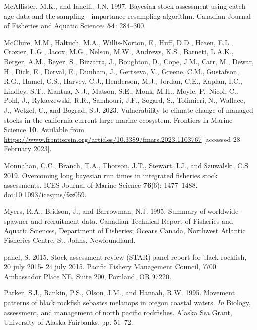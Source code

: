 \documentclass[11pt,
  letterpaper,
]{article}
\newlength{\cslhangindent}
\newenvironment{CSLReferences}[2] %
 {%
  \setlength{\parindent}{0pt}
  \ifodd #1 \everypar{\setlength{\hangindent}{\cslhangindent}}\ignorespaces\fi
  \ifnum #2 > 0
  \setlength{\parskip}{#2\baselineskip}
  \fi
 }%
 {}
\begin{document}
\begin{CSLReferences}{1}{0}
\leavevmode{}%
McAllister, M.K., and Ianelli, J.N. 1997. Bayesian stock assessment using catch-age data and the sampling - importance resampling algorithm. Canadian Journal of Fisheries and Aquatic Sciences \textbf{54}: 284--300.

\leavevmode{}%
McClure, M.M., Haltuch, M.A., Willis-Norton, E., Huff, D.D., Hazen, E.L., Crozier, L.G., Jacox, M.G., Nelson, M.W., Andrews, K.S., Barnett, L.A.K., Berger, A.M., Beyer, S., Bizzarro, J., Boughton, D., Cope, J.M., Carr, M., Dewar, H., Dick, E., Dorval, E., Dunham, J., Gertseva, V., Greene, C.M., Gustafson, R.G., Hamel, O.S., Harvey, C.J., Henderson, M.J., Jordan, C.E., Kaplan, I.C., Lindley, S.T., Mantua, N.J., Matson, S.E., Monk, M.H., Moyle, P., Nicol, C., Pohl, J., Rykaczewski, R.R., Samhouri, J.F., Sogard, S., Tolimieri, N., Wallace, J., Wetzel, C., and Bograd, S.J. 2023. Vulnerability to climate change of managed stocks in the california current large marine ecosystem. Frontiers in Marine Science \textbf{10}. Available from \url{https://www.frontiersin.org/articles/10.3389/fmars.2023.1103767} {[}accessed 28 February 2023{]}.

\leavevmode{}%
Monnahan, C.C., Branch, T.A., Thorson, J.T., Stewart, I.J., and Szuwalski, C.S. 2019. Overcoming long bayesian run times in integrated fisheries stock assessments. {ICES} Journal of Marine Science \textbf{76}(6): 1477--1488. doi:\href{https://doi.org/10.1093/icesjms/fsz059}{10.1093/icesjms/fsz059}.

\leavevmode{}%
Myers, R.A., Bridson, J., and Barrowman, N.J. 1995. Summary of worldwide spawner and recruitment data. Canadian Technical Report of Fisheries and Aquatic Sciences, Department of Fisheries; Oceans Canada, Northwest Atlantic Fisheries Centre, St. Johns, Newfoundland.

\leavevmode{}%
panel, S. 2015. Stock assessment review (STAR) panel report for black rockfish, 20 july 2015- 24 july 2015. Pacific Fishery Management Council, 7700 Ambassador Place NE, Suite 200, Portland, OR 97220.

\leavevmode{}%
Parker, S.J., Rankin, P.S., Olson, J.M., and Hannah, R.W. 1995. Movement patterns of black rockfish sebastes melanops in oregon coastal waters. \emph{In} Biology, assessment, and management of north pacific rockfishes. Alaska Sea Grant, University of Alaska Fairbanks. pp. 51--72.


\end{CSLReferences}
\end{document}
